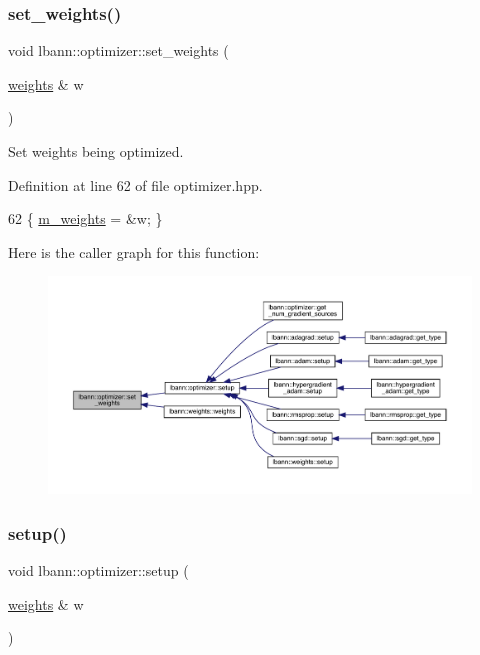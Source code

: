 \subsubsection{\texorpdfstring{set\+\_\+weights()}{set\_weights()}}
{\footnotesize\ttfamily void lbann\+::optimizer\+::set\+\_\+weights (\begin{DoxyParamCaption}\item[{\hyperlink{classlbann_1_1weights}{weights} \&}]{w }\end{DoxyParamCaption})\hspace{0.3cm}{\ttfamily [inline]}}

Set weights being optimized. 

Definition at line 62 of file optimizer.\+hpp.


\begin{DoxyCode}
62 \{ \hyperlink{classlbann_1_1optimizer_a33b57b578a089d9ffe6715bb3996907c}{m\_weights} = &w; \}
\end{DoxyCode}
Here is the caller graph for this function\+:\nopagebreak
\begin{figure}[H]
\begin{center}
\leavevmode
\includegraphics[width=350pt]{classlbann_1_1optimizer_afc00daf2acb6af7e29786524126660c2_icgraph}
\end{center}
\end{figure}
\mbox{\label{classlbann_1_1optimizer_a7641a88b3c166df2d974a298622b992b}} 
\subsubsection{\texorpdfstring{setup()}{setup()}}
{\footnotesize\ttfamily void lbann\+::optimizer\+::setup (\begin{DoxyParamCaption}\item[{\hyperlink{classlbann_1_1weights}{weights} \&}]{w }\end{DoxyParamCaption})\hspace{0.3cm}{\ttfamily [virtual]}}

